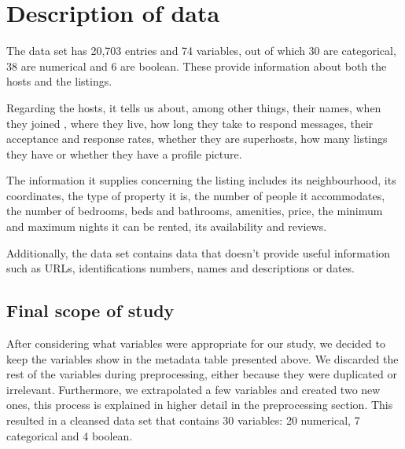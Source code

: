 


\section{Description of data}%
\label{sec:description_of_data}

The data set has 20,703 entries and 74 variables, out of which 30 are categorical,
38 are numerical and 6 are boolean. These provide information about both the hosts 
and the listings.

Regarding the hosts, it tells us about, among other things, their
names, when they joined \airbnb, where they live, how long they take to respond 
messages, their acceptance and response rates, whether they are superhosts, how 
many listings they have or whether they have a profile picture.

The information it supplies concerning the listing includes its
neighbourhood, its coordinates, the type of property it is, the number of people 
it accommodates, the number of bedrooms, beds and bathrooms, amenities, price, 
the minimum and maximum nights it can be rented, its availability and reviews.

Additionally, the data set contains data that doesn't provide useful information such
as URLs, identifications numbers, names and descriptions or dates.






\subsection{Final scope of study}

After considering what variables were appropriate for our study, we decided to keep 
the variables show in the metadata table presented above. We discarded the rest
of the variables during preprocessing, either because they were duplicated or
irrelevant. Furthermore, we extrapolated a few variables and created 
two new ones, this process is explained in higher detail in the preprocessing 
section. This resulted in a cleansed data set that contains 30 variables: 
20 numerical, 7 categorical and 4 boolean.